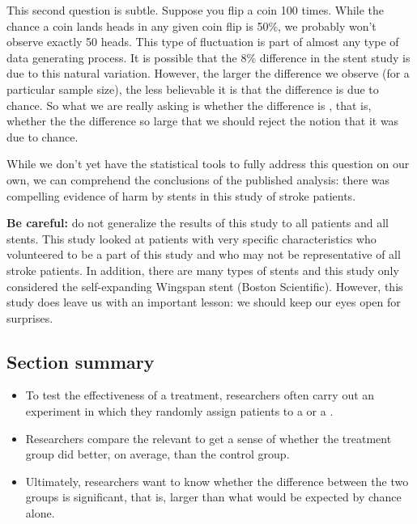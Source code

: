 This second question is subtle. Suppose you flip a coin 100 times. While the chance a coin lands heads in any given coin flip is 50\%, we probably won't observe exactly 50 heads. This type of fluctuation is part of almost any type of data generating process. It is possible that the 8\% difference in the stent study is due to this natural variation. However, the larger the difference we observe (for a particular sample size), the less believable it is that the difference is due to chance. So what we are really asking is whether the difference is , that is, whether the the difference so large that we should reject the notion that it was due to chance. 

While we don't yet have the statistical tools to fully address this question on our own, we can comprehend the conclusions of the published analysis: there was compelling evidence of harm by stents in this study of stroke patients.

\textbf{Be careful:} do not generalize the results of this study to all patients and all stents. This study looked at patients with very specific characteristics who volunteered to be a part of this study and who may not be representative of all stroke patients. In addition, there are many types of stents and this study only considered the self-expanding Wingspan stent (Boston Scientific). However, this study does leave us with an important lesson: we should keep our eyes open for surprises.


\subsection*{Section summary}
\begin{itemize}
\item To test the effectiveness of a treatment, researchers often carry out an experiment in which they randomly assign patients to a  or a .  
\item Researchers compare the relevant  to get a sense of whether the treatment group did better, on average, than the control group.
\item Ultimately, researchers want to know whether the difference between the two groups is significant, that is, larger than what would be expected by chance alone.
\end{itemize}



